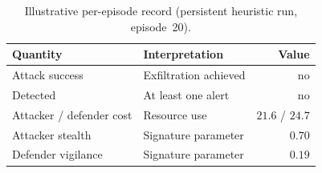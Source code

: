 \begin{table}[!t]
\caption{Illustrative per-episode record (persistent heuristic run, episode~20).}
\label{tab:episode-record}
\centering
\setlength{\tabcolsep}{3pt}
\begin{tabular}{@{}llr@{}}
\toprule
\textbf{Quantity} & \textbf{Interpretation} & \textbf{Value} \\
\midrule
Attack success & Exfiltration achieved & no \\
Detected & At least one alert & no \\
Attacker / defender cost & Resource use & $21.6$ / $24.7$ \\
Attacker stealth & Signature parameter & $0.70$ \\
Defender vigilance & Signature parameter & $0.19$ \\
\bottomrule
\end{tabular}
\end{table}
